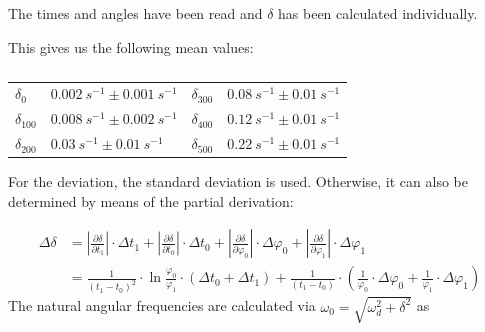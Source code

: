             The times and angles have been read and $\delta$ has been calculated individually.\par
            This gives us the following mean values:\par
            \begin{table}[h]
                \centering
                \caption[Mean values of the dampening coefficient]{}
                \begin{tabular}{@{}llll@{}}
                    \toprule
                    $\delta_0$        &$\SI{0.002}{s^{-1}} \pm \SI{0.001}{s^{-1}}$  &\hspace{10mm}$\delta_{300}$ &$\SI{0.08}{s^{-1}} \pm \SI{0.01}{s^{-1}}$\\
                    $\delta_{100}$    &$\SI{0.008}{s^{-1}} \pm \SI{0.002}{s^{-1}}$  &\hspace{10mm}$\delta_{400}$ &$\SI{0.12}{s^{-1}} \pm \SI{0.01}{s^{-1}}$\\
                    $\delta_{200}$    &$\SI{0.03}{s^{-1}} \pm \SI{0.01}{s^{-1}}$    &\hspace{10mm}$\delta_{500}$ &$\SI{0.22}{s^{-1}} \pm \SI{0.01}{s^{-1}}$\\
                    \bottomrule
                \end{tabular}
                \label{tab:dampening_coefficients}
            \end{table}
            For the deviation, the standard deviation is used. Otherwise, it can also be determined by means of the partial derivation:\par
            \begin{align}
                \Delta\delta    &= \left| \frac{\partial\delta}{\partial t_1} \right| \cdot \Delta t_1 + \left| \frac{\partial\delta}{\partial t_0} \right| \cdot \Delta t_0 + \left| \frac{\partial\delta}{\partial \varphi_0} \right| \cdot \Delta \varphi_0 + \left| \frac{\partial\delta}{\partial \varphi_1} \right| \cdot \Delta \varphi_1 \nonumber\\
                                &= \frac{1}{(t_1-t_0)^2} \cdot \ln{\frac{\varphi_0}{\varphi_1}} \cdot (\Delta t_0 + \Delta t_1) + \frac{1}{(t_1-t_0)} \cdot \left( \frac{1}{\varphi_0} \cdot \Delta\varphi_0 + \frac{1}{\varphi_1} \cdot \Delta\varphi_1 \right)
            \end{align}%
            The natural angular frequencies are calculated via $ \omega_0=\sqrt{\omega_d^2+\delta^2} $ as\par
